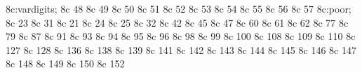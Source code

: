 
\modifydef 8c:vardigits;{%
   \characterdef \vardigits             *   {\setextrafont}
   \characterdef \zerooldstyle          8c  48
   \characterdef \oneoldstyle           8c  49
   \characterdef \twooldstyle           8c  50
   \characterdef \threeoldstyle         8c  51
   \characterdef \fouroldstyle          8c  52
   \characterdef \fiveoldstyle          8c  53
   \characterdef \sixoldstyle           8c  54
   \characterdef \sevenoldstyle         8c  55
   \characterdef \eightoldstyle         8c  56
   \characterdef \nineoldstyle          8c  57
}
\modifydef 8c:poor;{%
   \characterdel \capitalcompwordmark   8c  23
   \characterdel \ascendercompwordmark  8c  31
   \characterdel \twelveudash           8c  21
   \characterdel \textleftarrow         8c  24
   \characterdel \textrightarrow        8c  25
   \characterdel \blank                 8c  32
   \characterdel \asteriskcentered      8c  42
   \characterdel \dblhyphen             8c  45
   \characterdel \fractionsolidus       8c  47
   \characterdel \textlangle            8c  60
   \characterdel \textminus             8c  61
   \characterdel \textrangle            8c  62
   \characterdel \mho                   8c  77
   \characterdel \bigcircle             8c  79
   \characterdel \ohm                   8c  87
   \characterdel \lbrackdbl             8c  91
   \characterdel \rbrackdbl             8c  93
   \characterdel \textuparrow           8c  94
   \characterdel \textdownarrow         8c  95
   \characterdel \asciigrave            8c  96
   \characterdel \born                  8c  98
   \characterdel \divorced              8c  99
   \characterdel \died                  8c  100
   \characterdel \leaf                  8c  108
   \characterdel \married               8c  109
   \characterdel \musicalnote           8c  110
   \characterdel \dblhyphenchar         8c  127
   \characterdel \asciibreve            8c  128
   \characterdel \textbullet            8c  136
   \characterdel \dollaroldstyle        8c  138
   \characterdel \centoldstyle          8c  139
   \characterdel \colonmonetary         8c  141
   \characterdel \won                   8c  142
   \characterdel \naira                 8c  143
   \characterdel \guarani               8c  144
   \characterdel \peso                  8c  145
   \characterdel \lira                  8c  146
   \characterdel \recipe                8c  147
   \characterdel \interrobang           8c  148
   \characterdel \interrobangdown       8c  149
   \characterdel \dong                  8c  150
   \characterdel \pertenthousand        8c  152
}
